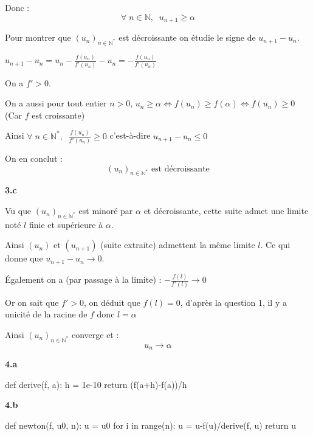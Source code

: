 \documentclass[11pt]{article}
\newcommand{\bfrac}[2]{\displaystyle\frac{#1}{#2}}
\newcommand{\N}{\mathbb{N}}
\begin{document}
\vspace{12px}
\noindent Donc :
\vspace{-13px}
\[\boxed{\forall\; n \in \N, \;\; u_{n+1} \geq \alpha}\]

\vspace{5px}

\noindent Pour montrer que $(u_n)_{n\in\N^*}$ est décroissante on étudie le signe de $u_{n+1} - u_n$.

$u_{n+1}-u_n = u_n - \bfrac{f(u_n)}{f'(u_n)} - u_n = -\bfrac{f(u_n)}{f'(u_n)}$

\noindent On a $f' > 0$.

\noindent On a aussi pour tout entier $n > 0$, $u_n \geq \alpha \Leftrightarrow f(u_n) \geq f(\alpha) \Leftrightarrow f(u_n) \geq 0$ (Car $f$ est croissante)

Ainsi $\forall \; n \in \N^*, \;\; \bfrac{f(u_n)}{f'(u_n)} \geq 0$ c'est-à-dire $u_{n+1}-u_n \leq 0$

\vspace{12px}
\noindent On en conclut :
\vspace{-15px}
\[\boxed{(u_n)_{n\in\N^*} \text{ est décroissante}}\]

\newpage
\textbf{3.c}

\noindent Vu que $(u_n)_{n\in\N^*}$ est minoré par $\alpha$ et décroissante, cette suite admet une limite noté $l$ finie et supérieure à $\alpha$.

\noindent Ainsi $(u_n)$ et $(u_{n+1})$ (suite extraite) admettent la même limite $l$. Ce qui donne que $u_{n+1} - u_n \longrightarrow 0$. 

\noindent Également on a (par passage à la limite) : $-\bfrac{f(l)}{f'(l)} \longrightarrow 0$

\noindent Or on sait que $f' > 0$, on déduit que $f(l) = 0$, d'après la question 1, il y a unicité de la racine de $f$ donc $l = \alpha$

\vspace{8px}
\noindent Ainsi $(u_n)_{n\in\N^*}$ converge et :
\vspace{-15px}
\[\boxed{u_n \longrightarrow \alpha}\]

\vspace{10px}
\textbf{4.a}
\begin{python}
def derive(f, a):
    h = 1e-10
    return (f(a+h)-f(a))/h
\end{python}


\vspace{10px}
\textbf{4.b}
\begin{python}
def newton(f, u0, n):
    u = u0
    for i in range(n):
        u = u-f(u)/derive(f, u)
    return u
\end{python}
\end{document}
